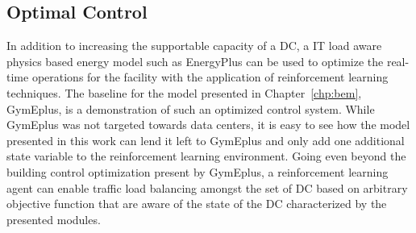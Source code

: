 \subsection{Optimal Control}
In addition to increasing the supportable capacity of a DC, a IT load aware physics based energy model such as EnergyPlus can be used to optimize the real-time operations for the facility with the application of reinforcement learning techniques. The baseline for the model presented in Chapter~\ref{chp:bem}, GymEplus, is a demonstration of such an optimized control system. While GymEplus was not targeted towards data centers, it is easy to see how the model presented in this work can lend it left to GymEplus and only add one additional state variable to the reinforcement learning environment. Going even beyond the building control optimization present by GymEplus, a reinforcement learning agent can enable traffic load balancing amongst the set of DC based on arbitrary objective function that are aware of the state of the DC characterized by the presented modules. 



